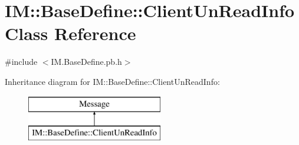 \hypertarget{class_i_m_1_1_base_define_1_1_client_un_read_info}{}\section{I\+M\+:\+:Base\+Define\+:\+:Client\+Un\+Read\+Info Class Reference}
\label{class_i_m_1_1_base_define_1_1_client_un_read_info}


{\ttfamily \#include $<$I\+M.\+Base\+Define.\+pb.\+h$>$}

Inheritance diagram for I\+M\+:\+:Base\+Define\+:\+:Client\+Un\+Read\+Info\+:\begin{figure}[H]
\begin{center}
\leavevmode
\includegraphics[height=2.000000cm]{class_i_m_1_1_base_define_1_1_client_un_read_info}
\end{center}
\end{figure}
